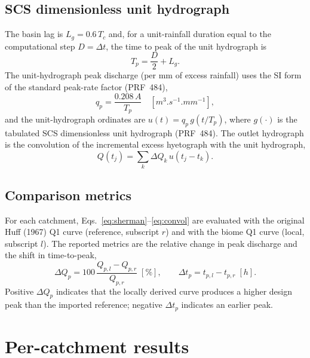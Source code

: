 \documentclass[11pt]{article}
\begin{document}
\subsection{SCS dimensionless unit hydrograph}

The basin lag is $L_g = 0.6\,T_c$ and, for a unit-rainfall duration
equal to the computational step $D=\Delta t$, the time to peak of the
unit hydrograph is
\begin{equation}
  T_p = \frac{D}{2} + L_g .
  \label{eq:tp}
\end{equation}
The unit-hydrograph peak discharge (per mm of excess rainfall) uses the
SI form of the standard peak-rate factor (PRF~484),
\begin{equation}
  q_p = \frac{0.208\,A}{T_p}\quad[\si{m^3.s^{-1}.mm^{-1}}],
  \label{eq:qp}
\end{equation}
and the unit-hydrograph ordinates are $u(t) = q_p\,g(t/T_p)$, where
$g(\cdot)$ is the tabulated SCS dimensionless unit hydrograph
(PRF~484). The outlet hydrograph is the convolution of the incremental
excess hyetograph with the unit hydrograph,
\begin{equation}
  Q(t_j) = \sum_{k} \Delta Q_k \, u(t_j - t_k).
  \label{eq:convol}
\end{equation}

\subsection{Comparison metrics}

For each catchment, Eqs.~\eqref{eq:sherman}--\eqref{eq:convol} are
evaluated with the original Huff (1967) Q1 curve (reference, subscript
$r$) and with the biome Q1 curve (local, subscript $l$). The reported
metrics are the relative change in peak discharge and the shift in
time-to-peak,
\begin{equation}
  \Delta Q_p = 100\,\frac{Q_{p,l} - Q_{p,r}}{Q_{p,r}}\;[\%],
  \qquad
  \Delta t_p = t_{p,l} - t_{p,r}\;[\si{h}].
  \label{eq:metrics}
\end{equation}
Positive $\Delta Q_p$ indicates that the locally derived curve produces
a higher design peak than the imported reference; negative $\Delta t_p$
indicates an earlier peak.

\section{Per-catchment results}
\label{sec:supp_results}
\end{document}
